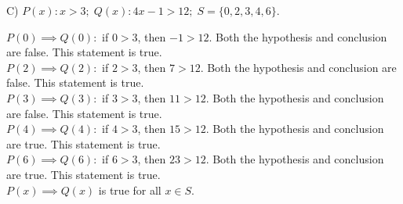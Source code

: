 \documentclass[12pt]{article}
\newenvironment{problem}[2][Problem]{\begin{trivlist}
		\item[\hskip \labelsep {\bfseries #1}\hskip \labelsep {\bfseries #2.}]}{\end{trivlist}}
\newenvironment{solution}[2][Solution]{\begin{trivlist}
		\item[\hskip \labelsep {\bfseries #1}\hskip \labelsep {\bfseries #2.}]}{\end{trivlist}}
\begin{document}
\begin{problem}{31}
	(C) $P(x): x > 3; \; Q(x): 4x -1 > 12; \; S=\{0, 2, 3, 4, 6\}.$ 
	\begin{solution}{c}
		$P(0) \implies Q(0):$ if $0 > 3$, then $-1 > 12$. Both the hypothesis and conclusion are false. This statement is true.\\
		$P(2) \implies Q(2):$ if $2 > 3$, then $7 > 12$. Both the hypothesis and conclusion are false. This statement is true.\\
		$P(3) \implies Q(3):$ if $3 > 3$, then $11 > 12$. Both the hypothesis and conclusion are false. This statement is true.\\
		$P(4) \implies Q(4):$ if $4 > 3$, then $15 > 12$. Both the hypothesis and conclusion are true. This statement is true.\\
		$P(6) \implies Q(6):$ if $6 > 3$, then $23 > 12$. Both the hypothesis and conclusion are true. This statement is true.\\
		$P(x) \implies Q(x)$ is true for all $x \in S$.
	\end{solution}
\end{problem}
\end{document}
